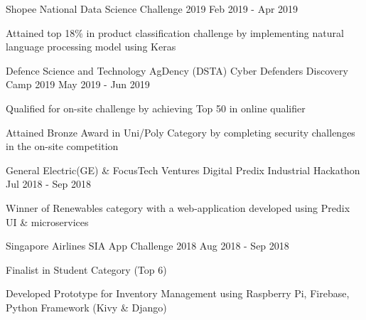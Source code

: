 
\begin{cventries}
  \cventry
    {Shopee} %
    {National Data Science Challenge 2019} %
    {} %
    {Feb 2019 - Apr 2019} %
    {
      \begin{cvitems} %
        \item {Attained top 18\% in product classification challenge by implementing natural language processing model using Keras }
      \end{cvitems}
    }
    
  \cventry
    {Defence Science and Technology AgDency (DSTA)} %
    {Cyber Defenders Discovery Camp 2019} %
    {} %
    {May 2019 - Jun 2019 } %
    {
      \begin{cvitems} %
        \item {Qualified for on-site challenge by achieving Top 50 in online qualifier}
        \item {Attained Bronze Award in Uni/Poly Category by completing security challenges in the on-site competition}
      \end{cvitems}
    }     
    

  \cventry
    {General Electric(GE) \& FocusTech Ventures } %
    {Digital Predix Industrial Hackathon } %
    {} %
    {Jul 2018 - Sep 2018} %
    {
      \begin{cvitems} %
        \item {Winner of Renewables category with a web-application developed using Predix UI \& microservices}
      \end{cvitems}
    }
    
  \cventry
    {Singapore Airlines} %
    {SIA App Challenge 2018} %
    {} %
    {Aug 2018 - Sep 2018} %
    {
      \begin{cvitems} %
        \item {Finalist in Student Category (Top 6)}
        \item {Developed Prototype for Inventory Management using Raspberry Pi, Firebase, Python Framework (Kivy \& Django)}
      \end{cvitems}
    }

\end{cventries}